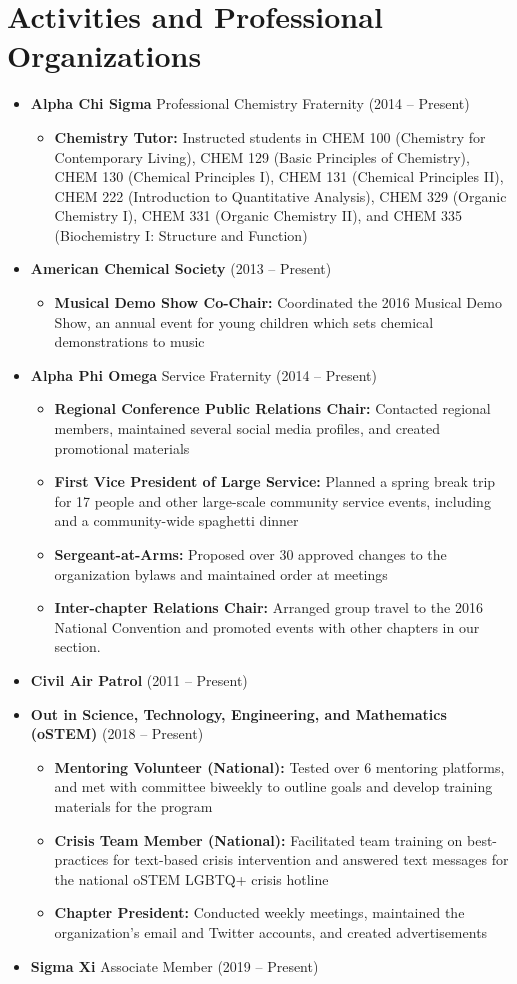 \documentclass[letterpaper,11pt]{article}
\newcommand{\resumeItem}[2]{
  \item\small{
    \textbf{#1}{ #2 \vspace{-2pt}}
  }
}
\newcommand{\resumeSubItem}[2]{\resumeItem{#1}{#2}\vspace{-4pt}}
\newcommand{\resumeSubHeadingListStart}{\begin{itemize}[leftmargin=*]}
\newcommand{\resumeSubHeadingListEnd}{\end{itemize}}
\newcommand{\resumeItemListStart}{\begin{itemize}}
\newcommand{\resumeItemListEnd}{\end{itemize}\vspace{-5pt}}
\begin{document}
\section{Activities and Professional Organizations}
  \resumeSubHeadingListStart
    \resumeSubItem{Alpha Chi Sigma}
      {Professional Chemistry Fraternity (2014 -- Present)}
            \resumeItemListStart
        \resumeItem{Chemistry Tutor\textnormal{:}}
          {Instructed students in CHEM 100 (Chemistry for Contemporary Living), CHEM 129 (Basic Principles of Chemistry), CHEM 130 (Chemical Principles I), CHEM 131 (Chemical Principles II), CHEM 222 (Introduction to Quantitative Analysis), CHEM 329 (Organic Chemistry I), CHEM 331 (Organic Chemistry II), and CHEM 335 (Biochemistry I: Structure and Function)}
      \resumeItemListEnd
    \resumeSubItem{American Chemical Society}
      {(2013 -- Present)}
            \resumeItemListStart
        \resumeItem{Musical Demo Show Co-Chair\textnormal{:}}
          {Coordinated the 2016 Musical Demo Show, an annual event for young children which sets chemical demonstrations to music}
      \resumeItemListEnd
    \resumeSubItem{Alpha Phi Omega}
      {Service Fraternity (2014 -- Present)}
            \resumeItemListStart
        \resumeItem{Regional Conference Public Relations Chair\textnormal{:}}
          {Contacted regional members, maintained several social media profiles, and created promotional materials}
        \resumeItem{First Vice President of Large Service\textnormal{:}}
          {Planned a spring break trip for 17 people and other large-scale community service events, including and a community-wide spaghetti dinner}
        \resumeItem{Sergeant-at-Arms\textnormal{:}}
          {Proposed over 30 approved changes to the organization bylaws and maintained order at meetings}
        \resumeItem{Inter-chapter Relations Chair\textnormal{:}}
          {Arranged group travel to the 2016 National Convention and promoted events with other chapters in our section.}
      \resumeItemListEnd
    \resumeSubItem{Civil Air Patrol}
      {(2011 -- Present)}
   \resumeSubItem{Out in Science, Technology, Engineering, and Mathematics (oSTEM)}
      {(2018 -- Present)}
            \resumeItemListStart
        \resumeItem{Mentoring Volunteer (National)\textnormal{:}}
          {Tested over 6 mentoring platforms, and met with committee biweekly to outline goals and develop training materials for the program}
        \resumeItem{Crisis Team Member (National)\textnormal{:}}
          {Facilitated team training on best-practices for text-based crisis intervention and answered text messages for the national oSTEM LGBTQ+ crisis hotline}
        \resumeItem{Chapter President\textnormal{:}}
          {Conducted weekly meetings, maintained the organization's email and Twitter accounts, and created advertisements}
      \resumeItemListEnd
    \resumeSubItem{Sigma Xi}
      {Associate Member (2019 -- Present)}
  \resumeSubHeadingListEnd
\end{document}

